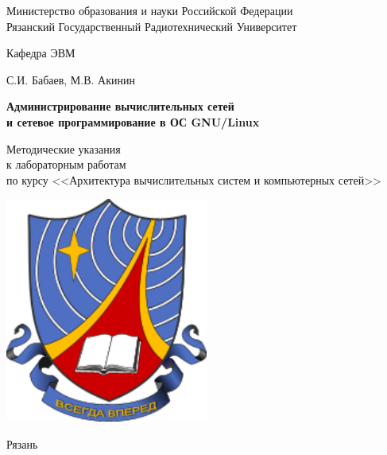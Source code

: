 
\begin{titlepage}

\begin{center}

Министерство образования и науки Российской Федерации \\
Рязанский Государственный Радиотехнический Университет

\bigskip

Кафедра ЭВМ

\vspace{5em}

С.И. Бабаев, М.В. Акинин

\vspace{3em}

{\Large \bf Администрирование вычислительных сетей \\ и сетевое программирование в ОС GNU/Linux}

\vspace{3em}

Методические указания\\
к лабораторным работам\\
по курсу <<Архитектура вычислительных систем и компьютерных сетей>>

\vfill

\includegraphics[width=0.5\textwidth]{image/title.png}

\vfill

Рязань \the\year

\end{center}

\thispagestyle{empty}

\end{titlepage}

\setcounter{page}{2}

\newpage

